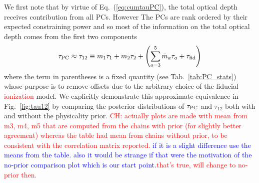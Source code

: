 \documentclass[prd,twocolumn,amsmath,amssymb,floatfix,superscriptaddress,nofootinbib]{revtex4-1}
\newcommand{\beq}{\begin{equation}}
\newcommand{\eeq}{\end{equation}}
\newcommand{\wh}[1]{\textcolor{blue}{#1}}
\newcommand{\ch}[1]{\textcolor{red}{#1}}
\begin{document}
 We first note that by virtue of Eq.~(\ref{eq:cumtauPC}), the total optical depth receives contribution from all PCs.  However
The PCs are rank ordered by their expected constraining power and so most of the information on the total optical depth comes from
the first two components
\beq
\tau_{\rm PC} \approx \tau_{12} \equiv  m_1 \tau_1 + m_2 \tau_2 +
\left(\sum_{a=3}^5 \bar m_a \tau_a + \tau_{\rm fid}\right) 
\label{eq:tau12}
\eeq
where the term in parentheses is a fixed quantity (see Tab.~\ref{tab:PC_stats}) whose purpose is to remove offsets due to the arbitrary choice of the fiducial \ch{ionization} model.  We explicitly demonstrate this approximate equivalence in Fig.~\ref{fig:tau12} by comparing the
posterior distributions of $\tau_{\rm PC}$ and $\tau_{12}$ both with and without the physicality prior.  
\ch{CH: actually plots are made with mean from m3, m4, m5 that are computed from the chains with prior (for slightly better agreement) whereas the table had mean from chains without prior, to be consistent with the correlation matrix reported. } \wh{if it is a slight difference use the means from the table. also it would be strange if that were the motivation of the no-prior comparison plot which is our start point.}\ch{that's true, will change to no-prior then.}
\end{document}
